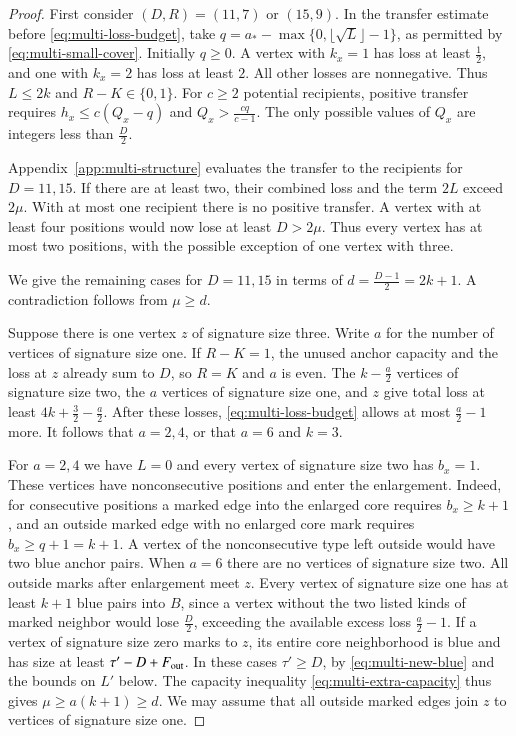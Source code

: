 \documentclass[preprint,11pt,numbers]{elsarticle-arxiv}
\numberwithin{equation}{section}
\theoremstyle{definition}
\begin{document}
\begin{proof}
First consider $(D,R)=(11,7)$ or $(15,9)$. In the transfer
estimate before \eqref{eq:multi-loss-budget}, take
$q=a_*-\max\{0,\lfloor\sqrt{L}\rfloor-1\}$, as permitted by
\eqref{eq:multi-small-cover}.
Initially $q\ge0$. A vertex with $k_x=1$ has loss at least
$\frac{1}{2}$, and one with $k_x=2$ has loss at least $2$. All other
losses are nonnegative. Thus $L\le 2k$ and $R-K\in\{0,1\}$. For $c\ge2$
potential recipients, positive transfer requires
$h_x\le c(Q_x-q)$ and $Q_x>\frac{cq}{c-1}$. The only possible values of $Q_x$ are integers less than $\frac{D}{2}$.

Appendix~\ref{app:multi-structure} evaluates the transfer to the
recipients for $D=11,15$. If there are at least two, their combined
loss and the term $2L$ exceed $2\mu$. With at most one recipient
there is no positive transfer. A vertex with at least four positions
would now lose at least $D>2\mu$. Thus every vertex has at most
two positions, with the possible exception of one vertex with three.

We give the remaining cases for $D=11,15$ in terms of
$d=\frac{D-1}{2}=2k+1$. A contradiction follows from $\mu\ge d$.


Suppose there is one vertex $z$ of signature size three. Write $a$
for the number of vertices of signature size one. If $R-K=1$, the
unused anchor capacity and the loss at $z$ already sum to $D$, so
$R=K$ and $a$ is even. The $k-\frac{a}{2}$ vertices of signature size
two, the $a$ vertices of signature size one, and $z$ give total
loss at least $4k+\frac{3}{2}-\frac{a}{2}$. After these losses,
\eqref{eq:multi-loss-budget} allows at most $\frac{a}{2}-1$ more.
It follows that $a=2,4$, or that $a=6$ and $k=3$.

For $a=2,4$ we have $L=0$ and every vertex of signature size two
has $b_x=1$. These vertices have nonconsecutive positions and
enter the enlargement. Indeed, for consecutive positions a marked
edge into the enlarged core requires $b_x\ge k+1$, and an outside
marked edge with no enlarged core mark requires $b_x\ge q+1=k+1$.
A vertex of the nonconsecutive type left outside would have two
blue anchor pairs. When $a=6$ there are no vertices of signature
size two. All outside marks after enlargement meet $z$. Every
vertex of signature size one has at least $k+1$ blue pairs into
$B$, since a vertex without the two listed kinds of marked neighbor
would lose $\frac{D}{2}$, exceeding the available excess loss
$\frac{a}{2}-1$. If a vertex of signature size zero marks to $z$,
its entire core neighborhood is blue and has size at least
$\tau'-D+F_{\rm out}$. In these cases $\tau'\ge D$, by
\eqref{eq:multi-new-blue} and the bounds on $L'$ below. The
capacity inequality \eqref{eq:multi-extra-capacity} thus gives
$\mu\ge a(k+1)\ge d$. We may assume that all outside marked
edges join $z$ to vertices of signature size one.


\end{proof}
\end{document}
